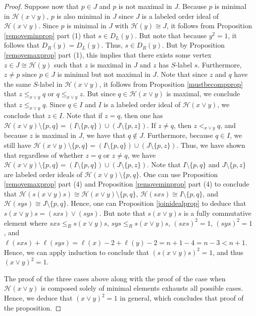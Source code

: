 \documentclass{amsart}
\theoremstyle{plain} %
\theoremstyle{definition}
\def\weakr{\leq_{R}}
\def\H#1{\mathcal{H}(#1)}
\begin{document}
\begin{proof}
    Suppose now that $ p\in J$ and $ p$ is not maximal in $ J$. Because $p$ is minimal in $ \H{x\vee y}$, $ p$ is also minimal in $J$ since $J$ is a labeled order ideal of $ \H{x\vee y}$. Since $ p$ is minimal in $J$ with $ \H{y} \cong J$, it follows from Proposition \ref{removeminprop} part (1) that $s \in D_{L}(y) $. But note that because $y^{2}  =1$, it follows that $ D_{R}(y) = D_{L}(y)$. Thus, $ s \in D_{R}(y)$. But by Proposition \ref{removemaxprop} part (1), this implies that there exists some vertex $ z \in J \cong \H{y}$ such that $ z$ is maximal in $J$ and $ z$ has $S$-label $s$. Furthermore, $ z\neq p$ since $ p\in J$ is minimal but not maximal in $J$. Note that since $ z$ and $ q$ have the same $ S$-label in $ \H{x\vee y}$, it follows from Proposition \ref{mustbecompprop} that $ z \leq_{x\vee y} q$ or $ q \leq_{x\vee y} z$. But since $ q\in \H{x\vee y}$ is maximal, we conclude that $ z \leq_{x\vee y} q$. Since $ q\in I$ and $I$ is a labeled order ideal of $ \H{x\vee y}$, we conclude that $ z\in I$. Note that if $ z = q$, then one has $ \H{x\vee y} \setminus \{ p,q \} = (I \setminus \{  p,q \}) \cup (J \setminus \{  p,z \} ) $. If $ z\neq q$, then $ z <_{x\vee y} q$, and because $ z$ is maximal in $J$, we have that $ q\notin J$. Furthermore, because $ q\in I$, we still have $ \H{x\vee y} \setminus \{ p,q \} = (I \setminus \{ p,q \} ) \cup (J \setminus \{ p,z \}) $. Thus, we have shown that regardless of whether $ z=q$ or $ z\neq q$, we have $ \H{x\vee y} \setminus \{ p,q \} = (I \setminus \{ p,q \} ) \cup (J \setminus \{ p,z \}) $. Note that $I \setminus \{ p,q \} $ and $ J \setminus \{ p,z \}$ are labeled order ideals of $ \H{x\vee y} \setminus \{ p,q \}$. One can use Proposition \ref{removemaxprop} part (4) and Proposition \ref{removeminprop} part (4) to conclude that $ \H{s(x\vee y)s} \cong \H{x\vee y}\setminus \{ p,q \}$, $ \H{sxs} \cong I \setminus \{ p,q \}$, and $ \H{sys} \cong J \setminus \{  p,q \}$. Hence, one can Proposition \ref{joinidealprop} to deduce that $ s(x\vee y)s = (sxs)\vee (sys)$. But note that $ s(x\vee y)s$ is a fully commutative element where $ sxs \weakr s(x\vee y)s$, $ sys\weakr s(x\vee y)s$, $ (sxs)^{2} = 1$, $ (sys)^{2}=1$, and $ \ell(sxs)+\ell(sys) = \ell(x) - 2 + \ell(y) -2 = n+1 - 4 = n-3 < n+1$. Hence, we can apply induction to conclude that $ (s(x\vee y)s)^{2} = 1$, and thus $ (x\vee y)^{2} = 1$.

    The proof of the three cases above along with the proof of the case when $ \H{x\vee y}$ is composed solely of minimal elements exhausts all possible cases. Hence, we deduce that $ (x\vee y)^{2} = 1$ in general, which concludes that proof of the proposition.

\end{proof}
\end{document}
